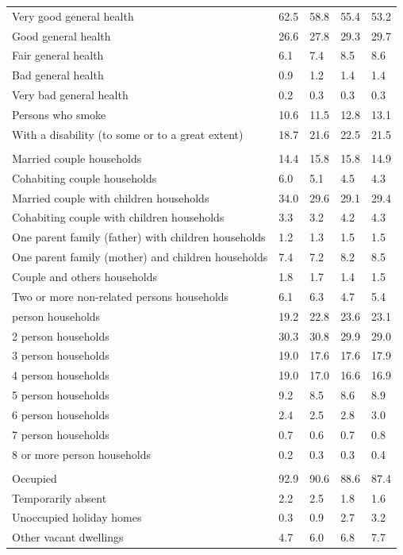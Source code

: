 \documentclass{article}
\begin{document}
\begin{table}[h]
\begin{tabular}{KTTTT}
    \hline
Very good general health & 62.5& 58.8&55.4& 53.2\\
Good general health & 26.6& 27.8& 29.3& 29.7\\
Fair general health & 6.1& 7.4&8.5& 8.6\\
Bad general health & 0.9& 1.2&1.4& 1.4\\
Very bad general health & 0.2& 0.3&0.3& 0.3\\
    \hline
Persons who smoke & 10.6& 11.5&12.8& 13.1\\
    \hline
With a disability (to some or to a great extent) & 18.7& 21.6&22.5& 21.5\\
\hline
    \\ 
    \hline
Married couple households & 14.4& 15.8& 15.8& 14.9\\
Cohabiting couple households & 6.0& 5.1& 4.5& 4.3\\
Married couple with children households & 34.0& 29.6& 29.1& 29.4\\
Cohabiting couple with children households & 3.3& 3.2& 4.2& 4.3\\
One parent family (father) with  children households & 1.2& 1.3& 1.5& 1.5\\
One parent family (mother) and children households & 7.4& 7.2& 8.2& 8.5\\
Couple and others households  & 1.8& 1.7& 1.4& 1.5\\
Two or more non-related persons households & 6.1& 6.3& 4.7& 5.4\\
     person households & 19.2& 22.8& 23.6& 23.1\\
2 person households & 30.3& 30.8& 29.9& 29.0\\
3 person households & 19.0& 17.6& 17.6& 17.9\\
4 person households & 19.0& 17.0& 16.6& 16.9\\
5 person households & 9.2& 8.5& 8.6& 8.9\\
6 person households & 2.4& 2.5& 2.8& 3.0\\
7 person households & 0.7& 0.6& 0.7& 0.8\\
8 or more person households & 0.2& 0.3& 0.3& 0.4\\
\hline
    \\ 
    \hline
Occupied & 92.9& 90.6& 88.6& 87.4\\
Temporarily absent & 2.2& 2.5& 1.8& 1.6\\
Unoccupied holiday homes & 0.3& 0.9& 2.7& 3.2\\
Other vacant dwellings & 4.7& 6.0& 6.8& 7.7\\
\hline
\end{tabular}
\end{table}
\end{document}
